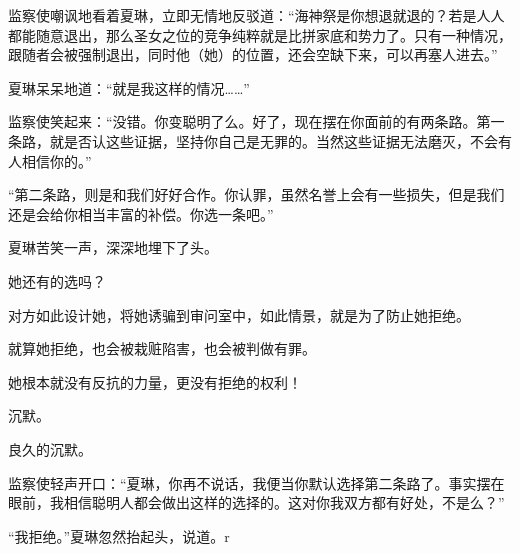 \begin{this_body}
监察使嘲讽地看着夏琳，立即无情地反驳道：“海神祭是你想退就退的？若是人人都能随意退出，那么圣女之位的竞争纯粹就是比拼家底和势力了。只有一种情况，跟随者会被强制退出，同时他（她）的位置，还会空缺下来，可以再塞人进去。”

夏琳呆呆地道：“就是我这样的情况……”

监察使笑起来：“没错。你变聪明了么。好了，现在摆在你面前的有两条路。第一条路，就是否认这些证据，坚持你自己是无罪的。当然这些证据无法磨灭，不会有人相信你的。”

“第二条路，则是和我们好好合作。你认罪，虽然名誉上会有一些损失，但是我们还是会给你相当丰富的补偿。你选一条吧。”

夏琳苦笑一声，深深地埋下了头。

她还有的选吗？

对方如此设计她，将她诱骗到审问室中，如此情景，就是为了防止她拒绝。

就算她拒绝，也会被栽赃陷害，也会被判做有罪。

她根本就没有反抗的力量，更没有拒绝的权利！

沉默。

良久的沉默。

监察使轻声开口：“夏琳，你再不说话，我便当你默认选择第二条路了。事实摆在眼前，我相信聪明人都会做出这样的选择的。这对你我双方都有好处，不是么？”

“我拒绝。”夏琳忽然抬起头，说道。r

\end{this_body}

